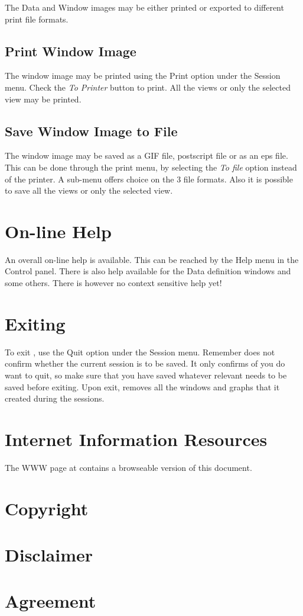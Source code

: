 The Data and Window images may be either printed or exported to
different print file formats.

\subsection{Print Window Image}

The window image may be printed using the Print option under the
Session menu. Check the {\em To Printer} button to print. All the
views or only the selected view may be printed.

\subsection{Save Window Image to File}

The window image may be saved as a GIF file, postscript file or as an
eps file. This can be done through the print menu, by selecting the
{\em To file} option instead of the printer. A sub-menu offers choice
on the 3 file formats. Also it is possible to save all the views or
only the selected view.

\section{On-line Help}

An overall on-line help is available. This can be reached by the Help
menu in the Control panel. There is also help available for the Data
definition windows and some others. There is however no context
sensitive help yet!

\section{Exiting \Devise}

To exit \Devise, use the Quit option under the Session menu. Remember
\Devise does not confirm whether the current session is to be saved. It
only confirms of you do want to quit, so make sure that you have saved
whatever relevant needs to be saved before exiting. Upon exit, \Devise
removes all the windows and graphs that it created during the
sessions.

\section{Internet Information Resources}

The \Devise WWW page at
 contains a
browseable version of this document.

\newpage 
\section*{Copyright}



\section*{Disclaimer}



\newpage
\section*{Agreement}




